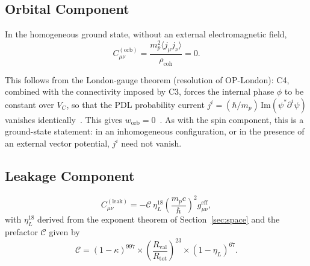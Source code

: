 \documentclass[11pt,a4paper]{article}
\newcommand{\VC}{V_C}
\newcommand{\Rtot}{R_{\mathrm{tot}}}
\newcommand{\Rval}{R_{\mathrm{val}}}
\newcommand{\kap}{\kappa}
\newcommand{\etaL}{\eta_L}
\newcommand{\rhocoh}{\rho_{\mathrm{coh}}}
\newcommand{\Corb}{C^{(\mathrm{orb})}}
\newcommand{\Cleak}{C^{(\mathrm{leak})}}
\newcommand{\geff}{g_{\mu\nu}^{\mathrm{eff}}}
\begin{document}
\subsection{Orbital Component}
\label{sec:orb}

\begin{theorembox}
In the homogeneous ground state, without an external electromagnetic field,
\begin{equation}
\Corb_{\mu\nu} = \frac{m_p^2\langle j_\mu j_\nu\rangle}{\rhocoh} = 0.
\label{eq:Corb}
\end{equation}
\end{theorembox}

This follows from the London-gauge theorem (resolution of OP-London): C4, combined with the connectivity imposed by C3, forces the internal phase $\phi$ to be constant over $\VC$, so that the PDL probability current $j^i=(\hbar/m_p)\,\mathrm{Im}(\psi^*\partial^i\psi)$ vanishes identically~\citep{D49}. This gives $w_{\mathrm{orb}}=0$~\citep{D54}. As with the spin component, this is a ground-state statement: in an inhomogeneous configuration, or in the presence of an external vector potential, $j^i$ need not vanish.

\subsection{Leakage Component}
\label{sec:leak}

\begin{theorembox}
\begin{equation}
\Cleak_{\mu\nu} = -\mathcal{C}\,\etaL^{18}\left(\frac{m_p c}{\hbar}\right)^2\geff,
\label{eq:Cleak}
\end{equation}
with $\etaL^{18}$ derived from the exponent theorem of Section~\ref{sec:space} and the prefactor $\mathcal{C}$ given by
\begin{equation}
\mathcal{C} = (1-\kap)^{997}\times\left(\frac{\Rval}{\Rtot}\right)^{23}\times(1-\etaL)^{67}.
\label{eq:Cprefactor}
\end{equation}
\end{theorembox}
\end{document}
